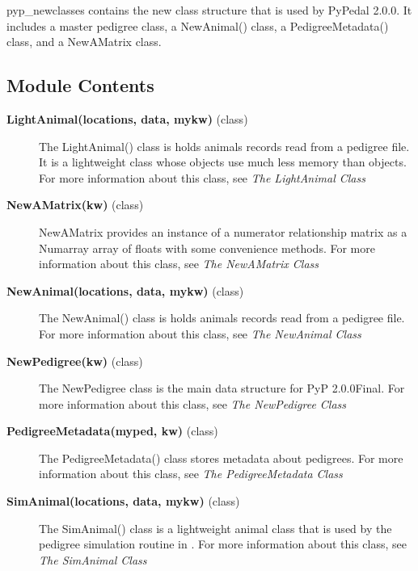 pyp\_newclasses\label{sec:functions-pyp-newclasses} contains the new class structure that is used by PyPedal 2.0.0. It includes a master pedigree class, a NewAnimal() class, a PedigreeMetadata() class, and a NewAMatrix class.

\subsection*{Module Contents}

\begin{description}
\item[\textbf{LightAnimal(locations, data, mykw)} (class)]
The LightAnimal() class is holds animals records read from a pedigree file. It is a lightweight class whose objects use much less memory than  objects.
For more information about this class, see \emph{The LightAnimal Class}

\item[\textbf{NewAMatrix(kw)} (class)]
NewAMatrix provides an instance of a numerator relationship matrix as a Numarray array of floats with some convenience methods.
For more information about this class, see \emph{The NewAMatrix Class}

\item[\textbf{NewAnimal(locations, data, mykw)} (class)]
The NewAnimal() class is holds animals records read from a pedigree file.
For more information about this class, see \emph{The NewAnimal Class}

\item[\textbf{NewPedigree(kw)} (class)]
The NewPedigree class is the main data structure for PyP 2.0.0Final.
For more information about this class, see \emph{The NewPedigree Class}

\item[\textbf{PedigreeMetadata(myped, kw)} (class)]
The PedigreeMetadata() class stores metadata about pedigrees.
For more information about this class, see \emph{The PedigreeMetadata Class}

\item[\textbf{SimAnimal(locations, data, mykw)} (class)]
The SimAnimal() class is a lightweight animal class that is used by the pedigree simulation routine in .
For more information about this class, see \emph{The SimAnimal Class}


\end{description}
